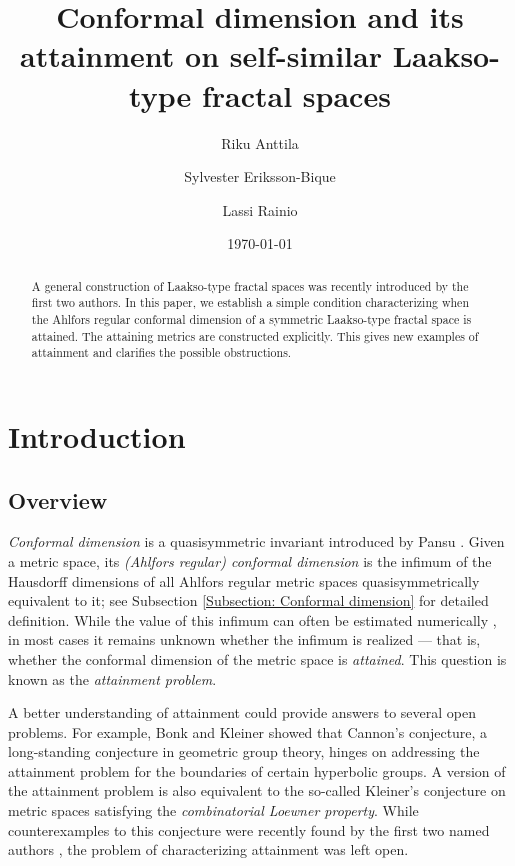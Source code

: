 \documentclass{amsart}
\title[Conformal Dimension on Laakso-Type Spaces]{Conformal dimension and its attainment on self-similar Laakso-type fractal spaces}
\author{Riku Anttila}
\author{Sylvester Eriksson-Bique}
\author{Lassi Rainio}
\date{\today}
\numberwithin{equation}{section}
\theoremstyle{definition}
\theoremstyle{remark}
\begin{document}
\begin{abstract}
A general construction of Laakso-type fractal spaces was recently introduced by the first two authors. In this paper, we establish a simple condition characterizing when the Ahlfors regular conformal dimension of a symmetric Laakso-type fractal space is attained. The attaining metrics are constructed explicitly. This gives new examples of attainment and clarifies the possible obstructions.
\end{abstract}




\maketitle

\section{Introduction}

\subsection{Overview}



\emph{Conformal dimension} is a quasisymmetric invariant introduced by Pansu \cite{P89}. Given a metric space, its \emph{(Ahlfors regular) conformal dimension} is the infimum of the Hausdorff dimensions of all Ahlfors regular metric spaces quasisymmetrically equivalent to it; see Subsection \ref{Subsection: Conformal dimension} for detailed definition. While the value of this infimum can often be estimated numerically \cite{Carrasco}, in most cases it remains unknown whether the infimum is realized --- that is, whether the conformal dimension of the metric space is \emph{attained}. This question is known as the \emph{attainment problem}.

A better understanding of attainment could provide answers to several open problems. For example, Bonk and Kleiner \cite{BK05} showed that Cannon's conjecture, a long-standing conjecture in geometric group theory, hinges on addressing the attainment problem for the boundaries of certain hyperbolic groups. A version of the attainment problem is also equivalent to the so-called Kleiner's conjecture \cite[Conjecture 7.5]{KleinerICM} on metric spaces satisfying the \emph{combinatorial Loewner property}. While counterexamples to this conjecture were recently found by the first two named authors \cite{anttila2024constructions}, the problem of characterizing attainment was left open.
\end{document}
